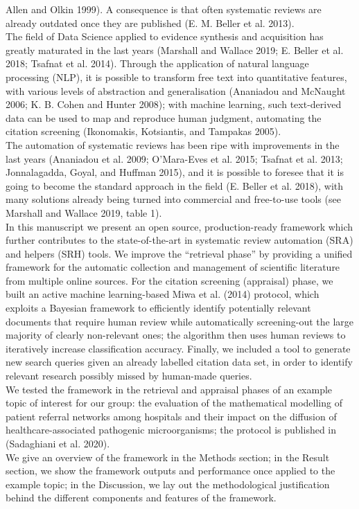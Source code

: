 \documentclass{article}
\begin{document}
Allen and Olkin 1999). A consequence is that often systematic reviews
are already outdated once they are published (E. M. Beller et al.
2013).\\
The field of Data Science applied to evidence synthesis and acquisition
has greatly maturated in the last years (Marshall and Wallace 2019; E.
Beller et al. 2018; Tsafnat et al. 2014). Through the application of
natural language processing (NLP), it is possible to transform free text
into quantitative features, with various levels of abstraction and
generalisation (Ananiadou and McNaught 2006; K. B. Cohen and Hunter
2008); with machine learning, such text-derived data can be used to map
and reproduce human judgment, automating the citation screening
(Ikonomakis, Kotsiantis, and Tampakas 2005).\\
The automation of systematic reviews has been ripe with improvements in
the last years (Ananiadou et al. 2009; O'Mara-Eves et al. 2015; Tsafnat
et al. 2013; Jonnalagadda, Goyal, and Huffman 2015), and it is possible
to foresee that it is going to become the standard approach in the field
(E. Beller et al. 2018), with many solutions already being turned into
commercial and free-to-use tools (see Marshall and Wallace 2019, table
1).\\
In this manuscript we present an open source, production-ready framework
which further contributes to the state-of-the-art in systematic review
automation (SRA) and helpers (SRH) tools. We improve the ``retrieval
phase'' by providing a unified framework for the automatic collection
and management of scientific literature from multiple online sources.
For the citation screening (appraisal) phase, we built an active machine
learning-based Miwa et al. (2014) protocol, which exploits a Bayesian
framework to efficiently identify potentially relevant documents that
require human review while automatically screening-out the large
majority of clearly non-relevant ones; the algorithm then uses human
reviews to iteratively increase classification accuracy. Finally, we
included a tool to generate new search queries given an already labelled
citation data set, in order to identify relevant research possibly
missed by human-made queries.\\
We tested the framework in the retrieval and appraisal phases of an
example topic of interest for our group: the evaluation of the
mathematical modelling of patient referral networks among hospitals and
their impact on the diffusion of healthcare-associated pathogenic
microorganisms; the protocol is published in (Sadaghiani et al. 2020).\\
We give an overview of the framework in the Methods section; in the
Result section, we show the framework outputs and performance once
applied to the example topic; in the Discussion, we lay out the
methodological justification behind the different components and
features of the framework.
\end{document}
